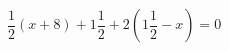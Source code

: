 \begin{ex}
	\begin{condition}
		\( \dfrac{1}{2}(x+8)+1\dfrac{1}{2}+2\left( 1\dfrac{1}{2}-x \right)=0 \)
	\end{condition}
\end{ex}